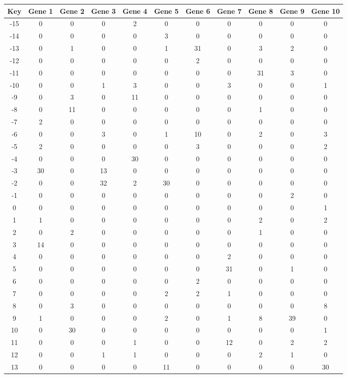 \begin{tabular}{|c|c|c|c|c|c|c|c|c|c|c|}
\hline
Key & Gene 1 & Gene 2 & Gene 3 & Gene 4 & Gene 5 & Gene 6 & Gene 7 & Gene 8 & Gene 9 & Gene 10 \\
\hline
-15 & 0 & 0 & 0 & 2 & 0 & 0 & 0 & 0 & 0 & 0 \\
-14 & 0 & 0 & 0 & 0 & 3 & 0 & 0 & 0 & 0 & 0 \\
-13 & 0 & 1 & 0 & 0 & 1 & 31 & 0 & 3 & 2 & 0 \\
-12 & 0 & 0 & 0 & 0 & 0 & 2 & 0 & 0 & 0 & 0 \\
-11 & 0 & 0 & 0 & 0 & 0 & 0 & 0 & 31 & 3 & 0 \\
-10 & 0 & 0 & 1 & 3 & 0 & 0 & 3 & 0 & 0 & 1 \\
-9 & 0 & 3 & 0 & 11 & 0 & 0 & 0 & 0 & 0 & 0 \\
-8 & 0 & 11 & 0 & 0 & 0 & 0 & 0 & 1 & 0 & 0 \\
-7 & 2 & 0 & 0 & 0 & 0 & 0 & 0 & 0 & 0 & 0 \\
-6 & 0 & 0 & 3 & 0 & 1 & 10 & 0 & 2 & 0 & 3 \\
-5 & 2 & 0 & 0 & 0 & 0 & 3 & 0 & 0 & 0 & 2 \\
-4 & 0 & 0 & 0 & 30 & 0 & 0 & 0 & 0 & 0 & 0 \\
-3 & 30 & 0 & 13 & 0 & 0 & 0 & 0 & 0 & 0 & 0 \\
-2 & 0 & 0 & 32 & 2 & 30 & 0 & 0 & 0 & 0 & 0 \\
-1 & 0 & 0 & 0 & 0 & 0 & 0 & 0 & 0 & 2 & 0 \\
0 & 0 & 0 & 0 & 0 & 0 & 0 & 0 & 0 & 0 & 1 \\
1 & 1 & 0 & 0 & 0 & 0 & 0 & 0 & 2 & 0 & 2 \\
2 & 0 & 2 & 0 & 0 & 0 & 0 & 0 & 1 & 0 & 0 \\
3 & 14 & 0 & 0 & 0 & 0 & 0 & 0 & 0 & 0 & 0 \\
4 & 0 & 0 & 0 & 0 & 0 & 0 & 2 & 0 & 0 & 0 \\
5 & 0 & 0 & 0 & 0 & 0 & 0 & 31 & 0 & 1 & 0 \\
6 & 0 & 0 & 0 & 0 & 0 & 2 & 0 & 0 & 0 & 0 \\
7 & 0 & 0 & 0 & 0 & 2 & 2 & 1 & 0 & 0 & 0 \\
8 & 0 & 3 & 0 & 0 & 0 & 0 & 0 & 0 & 0 & 8 \\
9 & 1 & 0 & 0 & 0 & 2 & 0 & 1 & 8 & 39 & 0 \\
10 & 0 & 30 & 0 & 0 & 0 & 0 & 0 & 0 & 0 & 1 \\
11 & 0 & 0 & 0 & 1 & 0 & 0 & 12 & 0 & 2 & 2 \\
12 & 0 & 0 & 1 & 1 & 0 & 0 & 0 & 2 & 1 & 0 \\
13 & 0 & 0 & 0 & 0 & 11 & 0 & 0 & 0 & 0 & 30 \\
\hline
\end{tabular}